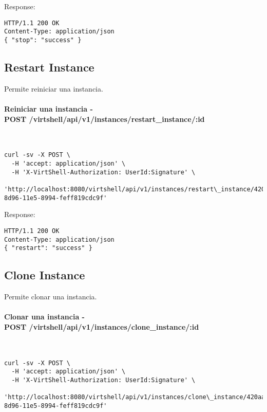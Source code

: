 Response:

\begin{lstlisting}[style=json]
HTTP/1.1 200 OK
Content-Type: application/json
{ "stop": "success" }
\end{lstlisting}


\subsection{Restart Instance}

Permite reiniciar una instancia.

\paragraph{Reiniciar una instancia - \\ POST /virtshell/api/v1/instances/restart\_instance/:id} ~\\

\begin{lstlisting}[style=json]
curl -sv -X POST \
  -H 'accept: application/json' \
  -H 'X-VirtShell-Authorization: UserId:Signature' \
   'http://localhost:8080/virtshell/api/v1/instances/restart\_instance/420aa3f0-8d96-11e5-8994-feff819cdc9f'
\end{lstlisting}

Response:

\begin{lstlisting}[style=json]
HTTP/1.1 200 OK
Content-Type: application/json
{ "restart": "success" }
\end{lstlisting}


\subsection{Clone Instance}

Permite clonar una instancia.

\paragraph{Clonar una instancia - \\ POST /virtshell/api/v1/instances/clone\_instance/:id} ~\\

\begin{lstlisting}[style=json]
curl -sv -X POST \
  -H 'accept: application/json' \
  -H 'X-VirtShell-Authorization: UserId:Signature' \
   'http://localhost:8080/virtshell/api/v1/instances/clone\_instance/420aa3f0-8d96-11e5-8994-feff819cdc9f'
\end{lstlisting}

